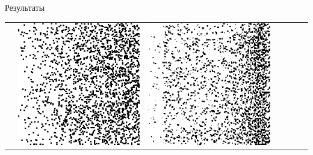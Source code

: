\documentclass[12pt]{beamer}
\begin{document}
\begin{frame}{Результаты}
\begin{table}
\begin{center}
\begin{tabular}{p{1.2cm} p{1.2cm} p{1.2cm} p{1.2cm} p{1.2cm} p{1.2cm} p{1.2cm}}
					&
					\includegraphics[width=1\linewidth]{8-results/sand-trend8/pan1}
					&
					\includegraphics[width=1\linewidth]{8-results/sand-trend8/nf32e5/gen1}
					&

\end{tabular}
\end{center}
\end{table}
\end{frame}
\end{document}
